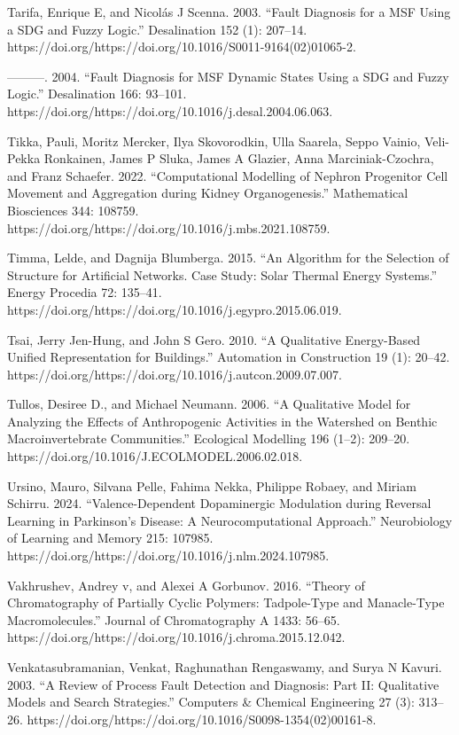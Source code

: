 \documentclass[utf8]{gradu3}
\begin{document}
Tarifa, Enrique E, and Nicolás J Scenna. 2003. “Fault Diagnosis for a MSF Using a SDG and Fuzzy Logic.” Desalination 152 (1): 207–14. https://doi.org/https://doi.org/10.1016/S0011-9164(02)01065-2.

———. 2004. “Fault Diagnosis for MSF Dynamic States Using a SDG and Fuzzy Logic.” Desalination 166: 93–101. https://doi.org/https://doi.org/10.1016/j.desal.2004.06.063.

Tikka, Pauli, Moritz Mercker, Ilya Skovorodkin, Ulla Saarela, Seppo Vainio, Veli-Pekka Ronkainen, James P Sluka, James A Glazier, Anna Marciniak-Czochra, and Franz Schaefer. 2022. “Computational Modelling of Nephron Progenitor Cell Movement and Aggregation during Kidney Organogenesis.” Mathematical Biosciences 344: 108759. https://doi.org/https://doi.org/10.1016/j.mbs.2021.108759.

Timma, Lelde, and Dagnija Blumberga. 2015. “An Algorithm for the Selection of Structure for Artificial Networks. Case Study: Solar Thermal Energy Systems.” Energy Procedia 72: 135–41. https://doi.org/https://doi.org/10.1016/j.egypro.2015.06.019.

Tsai, Jerry Jen-Hung, and John S Gero. 2010. “A Qualitative Energy-Based Unified Representation for Buildings.” Automation in Construction 19 (1): 20–42. https://doi.org/https://doi.org/10.1016/j.autcon.2009.07.007.

Tullos, Desiree D., and Michael Neumann. 2006. “A Qualitative Model for Analyzing the Effects of Anthropogenic Activities in the Watershed on Benthic Macroinvertebrate Communities.” Ecological Modelling 196 (1–2): 209–20. https://doi.org/10.1016/J.ECOLMODEL.2006.02.018.

Ursino, Mauro, Silvana Pelle, Fahima Nekka, Philippe Robaey, and Miriam Schirru. 2024. “Valence-Dependent Dopaminergic Modulation during Reversal Learning in Parkinson’s Disease: A Neurocomputational Approach.” Neurobiology of Learning and Memory 215: 107985. https://doi.org/https://doi.org/10.1016/j.nlm.2024.107985.

Vakhrushev, Andrey v, and Alexei A Gorbunov. 2016. “Theory of Chromatography of Partially Cyclic Polymers: Tadpole-Type and Manacle-Type Macromolecules.” Journal of Chromatography A 1433: 56–65. https://doi.org/https://doi.org/10.1016/j.chroma.2015.12.042.

Venkatasubramanian, Venkat, Raghunathan Rengaswamy, and Surya N Kavuri. 2003. “A Review of Process Fault Detection and Diagnosis: Part II: Qualitative Models and Search Strategies.” Computers \& Chemical Engineering 27 (3): 313–26. https://doi.org/https://doi.org/10.1016/S0098-1354(02)00161-8.
\end{document}

